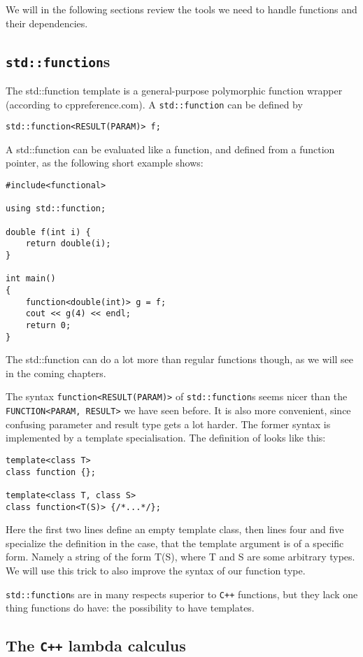 \documentclass{article}
\newcommand{\cc}{\texttt{C++}\xspace}
\begin{document}
We will in the following sections review the tools we need to handle functions and their dependencies.

\subsection{\texttt{std::function}s}

The std::function template is a general-purpose polymorphic function wrapper (according to cppreference.com). A \texttt{std::function} can be defined by
\begin{lstlisting}
std::function<RESULT(PARAM)> f;
\end{lstlisting}

A std::function can be evaluated like a function, and defined from a function pointer, as the following short example shows:
\begin{lstlisting}
#include<functional>

using std::function;

double f(int i) {
	return double(i);
}

int main()
{
	function<double(int)> g = f;
	cout << g(4) << endl;
	return 0;
}
\end{lstlisting}
The std::function can do a lot more than regular functions though, as we will see in the coming chapters.

The syntax \texttt{function<RESULT(PARAM)>} of \texttt{std::function}s seems nicer than the \texttt{FUNCTION<PARAM, RESULT>} we have seen before. It is also more convenient, since confusing parameter and result type gets a lot harder. The former syntax is implemented by a template specialisation. The definition of looks like this:
\begin{lstlisting}
template<class T>
class function {};

template<class T, class S>
class function<T(S)> {/*...*/};
\end{lstlisting}
Here the first two lines define an empty template class, then lines four and five specialize the definition in the case, that the template argument is of a specific form. Namely a string of the form T(S), where T and S are some arbitrary types. We will use this trick to also improve the syntax of our function type.

\texttt{std::function}s are in many respects superior to \cc functions, but they lack one thing functions do have: the possibility to have templates.


\subsection{The \cc lambda calculus}
\end{document}
